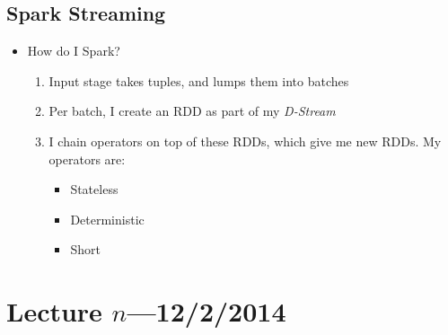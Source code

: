 \documentclass[10pt]{article}
\begin{document}
\subsection{Spark Streaming}

\begin{itemize}
\item How do I Spark?
\begin{enumerate}
\item Input stage takes tuples, and lumps them into batches
\item Per batch, I create an RDD as part of my \emph{D-Stream}
\item I chain operators on top of these RDDs, which give me new RDDs. My operators are:
\begin{itemize}
\item Stateless
\item Deterministic
\item Short
\end{itemize}
\end{enumerate}
\end{itemize}

\section{Lecture $n$---12/2/2014}
\end{document}
